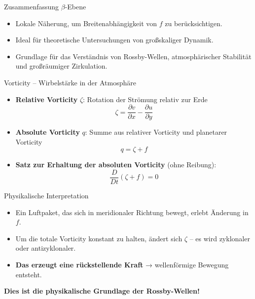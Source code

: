         \begin{frame}{Zusammenfassung \(\beta\)-Ebene}
        \begin{itemize}
            \item Lokale Näherung, um Breitenabhängigkeit von \(f\) zu berücksichtigen.
            \item Ideal für theoretische Untersuchungen von großskaliger Dynamik.
            \item Grundlage für das Verständnis von Rossby-Wellen, atmosphärischer Stabilität und großräumiger Zirkulation.
        \end{itemize}
        \end{frame}
        
        \begin{frame}{Vorticity – Wirbelstärke in der Atmosphäre}
            \begin{itemize}
                \item \textbf{Relative Vorticity} \(\zeta\): Rotation der Strömung relativ zur Erde
                \[
                    \zeta = \frac{\partial v}{\partial x} - \frac{\partial u}{\partial y}
                \]
                \item \textbf{Absolute Vorticity} \(q\): Summe aus relativer Vorticity und planetarer Vorticity
                \[
                    q = \zeta + f
                \]
                \item \textbf{Satz zur Erhaltung der absoluten Vorticity} (ohne Reibung):
                \[
                    \frac{D}{Dt} (\zeta + f) = 0
                \]
            \end{itemize}
            \end{frame}
            
            \begin{frame}{Physikalische Interpretation}
            \begin{itemize}
                \item Ein Luftpaket, das sich in meridionaler Richtung bewegt, erlebt Änderung in \(f\).
                \item Um die totale Vorticity konstant zu halten, ändert sich \(\zeta\) – es wird zyklonaler oder antizyklonaler.
                \item \textbf{Das erzeugt eine rückstellende Kraft} → wellenförmige Bewegung entsteht.
            \end{itemize}
            
            \vspace{0.4cm}
            \textbf{Dies ist die physikalische Grundlage der Rossby-Wellen!}
            \end{frame}
            
